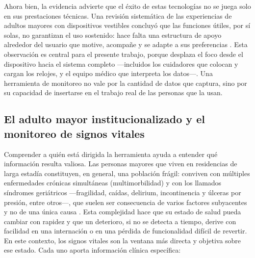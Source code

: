 Ahora bien, la evidencia advierte que el éxito de estas tecnologías no se juega solo en sus prestaciones técnicas. Una revisión sistemática de las experiencias de adultos mayores con dispositivos vestibles concluyó que las funciones útiles, por sí solas, no garantizan el uso sostenido: hace falta una estructura de apoyo alrededor del usuario que motive, acompañe y se adapte a sus preferencias \cite{moore2021}. Esta observación es central para el presente trabajo, porque desplaza el foco desde el dispositivo hacia el sistema completo —incluidos los cuidadores que colocan y cargan los relojes, y el equipo médico que interpreta los datos—. Una herramienta de monitoreo no vale por la cantidad de datos que captura, sino por su capacidad de insertarse en el trabajo real de las personas que la usan.\\


\subsection{El adulto mayor institucionalizado y el monitoreo de signos vitales}
Comprender a quién está dirigida la herramienta ayuda a entender qué información resulta valiosa. Las personas mayores que viven en residencias de larga estadía constituyen, en general, una población frágil: conviven con múltiples enfermedades crónicas simultáneas (multimorbilidad) y con los llamados síndromes geriátricos —fragilidad, caídas, delirium, incontinencia y úlceras por presión, entre otros—, que suelen ser consecuencia de varios factores subyacentes y no de una única causa \cite{who_ageing}. Esta complejidad hace que su estado de salud pueda cambiar con rapidez y que un deterioro, si no se detecta a tiempo, derive con facilidad en una internación o en una pérdida de funcionalidad difícil de revertir.\\

En este contexto, los signos vitales son la ventana más directa y objetiva sobre ese estado. Cada uno aporta información clínica específica:\\


